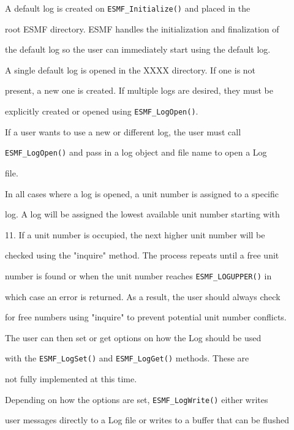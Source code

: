 




A default log is created on {\tt ESMF\_Initialize()} and placed in the

root ESMF directory.  ESMF handles the initialization and finalization of

the default log so the user can immediately start using the default log.

A single default log is opened in the XXXX directory.  If one is not 

present, a new one is created.  If multiple logs are desired, they must be

explicitly created or opened using {\tt ESMF\_LogOpen()}.


If a user wants to use a new or different log, the user must call

{\tt ESMF\_LogOpen()} and pass in a log object and file name to open a Log 

file.  


In all cases where a log is opened, a unit number is assigned to a specific

log.  A log will be assigned the lowest available unit number starting with

11.  If a unit number is occupied, the next higher unit number will be 

checked using the "inquire" method.  The process repeats until a free unit
 
number is found or when the unit number reaches {\tt ESMF\_LOGUPPER()} in
 
which case an error is returned.  As a result, the user should always check

for free numbers using "inquire" to prevent potential unit number conflicts.


The user can then set or get options on how the Log should be used 

with the {\tt ESMF\_LogSet()} and {\tt ESMF\_LogGet()} methods.  These are 

not fully implemented at this time. 


Depending on how the options are set, {\tt ESMF\_LogWrite()} either writes

user messages directly to a Log file or writes to a buffer that can be flushed

